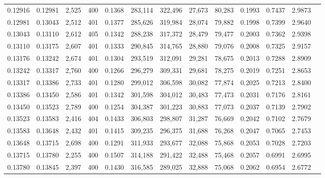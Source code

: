 \begin{tabular}{rrrrrrrrrrrrr}
0.12916 & 0.12981 & 2,525 & 400 &                                     0.1368 & 283,114 & 322,496 &  27,673 &  80,283 & 0.1993 & 0.7437 & 2.9873 \\
0.12981 & 0.13043 & 2,512 & 401 &                                     0.1377 & 285,626 & 319,984 &  28,074 &  79,882 & 0.1998 & 0.7399 & 2.9640 \\
0.13043 & 0.13110 & 2,612 & 405 &                                     0.1342 & 288,238 & 317,372 &  28,479 &  79,477 & 0.2003 & 0.7362 & 2.9398 \\
0.13110 & 0.13175 & 2,607 & 401 &                                     0.1333 & 290,845 & 314,765 &  28,880 &  79,076 & 0.2008 & 0.7325 & 2.9157 \\
0.13176 & 0.13242 & 2,674 & 401 &                                     0.1304 & 293,519 & 312,091 &  29,281 &  78,675 & 0.2013 & 0.7288 & 2.8909 \\
0.13242 & 0.13317 & 2,760 & 400 &                                     0.1266 & 296,279 & 309,331 &  29,681 &  78,275 & 0.2019 & 0.7251 & 2.8653 \\
0.13317 & 0.13386 & 2,733 & 401 &                                     0.1280 & 299,012 & 306,598 &  30,082 &  77,874 & 0.2025 & 0.7213 & 2.8400 \\
0.13386 & 0.13450 & 2,586 & 401 &                                     0.1342 & 301,598 & 304,012 &  30,483 &  77,473 & 0.2031 & 0.7176 & 2.8161 \\
0.13450 & 0.13523 & 2,789 & 400 &                                     0.1254 & 304,387 & 301,223 &  30,883 &  77,073 & 0.2037 & 0.7139 & 2.7902 \\
0.13523 & 0.13583 & 2,416 & 404 &                                     0.1433 & 306,803 & 298,807 &  31,287 &  76,669 & 0.2042 & 0.7102 & 2.7679 \\
0.13583 & 0.13648 & 2,432 & 401 &                                     0.1415 & 309,235 & 296,375 &  31,688 &  76,268 & 0.2047 & 0.7065 & 2.7453 \\
0.13648 & 0.13715 & 2,698 & 400 &                                     0.1291 & 311,933 & 293,677 &  32,088 &  75,868 & 0.2053 & 0.7028 & 2.7203 \\
0.13715 & 0.13780 & 2,255 & 400 &                                     0.1507 & 314,188 & 291,422 &  32,488 &  75,468 & 0.2057 & 0.6991 & 2.6995 \\
0.13780 & 0.13845 & 2,397 & 400 &                                     0.1430 & 316,585 & 289,025 &  32,888 &  75,068 & 0.2062 & 0.6954 & 2.6772 \\

\end{tabular}
